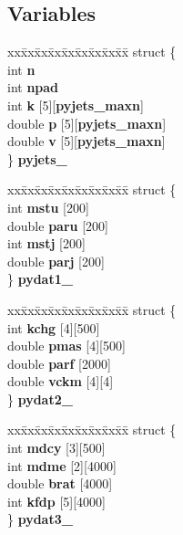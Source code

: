 \subsection*{Variables}
\begin{CompactItemize}
\item 
\begin{tabbing}
xx\=xx\=xx\=xx\=xx\=xx\=xx\=xx\=xx\=\kill
struct \{\\
\>int {\bf n}\\
\>int {\bf npad}\\
\>int {\bf k} [5][{\bf pyjets\_maxn}]\\
\>double {\bf p} [5][{\bf pyjets\_maxn}]\\
\>double {\bf v} [5][{\bf pyjets\_maxn}]\\
\} {\bf pyjets\_}\\

\end{tabbing}\item 
\begin{tabbing}
xx\=xx\=xx\=xx\=xx\=xx\=xx\=xx\=xx\=\kill
struct \{\\
\>int {\bf mstu} [200]\\
\>double {\bf paru} [200]\\
\>int {\bf mstj} [200]\\
\>double {\bf parj} [200]\\
\} {\bf pydat1\_}\\

\end{tabbing}\item 
\begin{tabbing}
xx\=xx\=xx\=xx\=xx\=xx\=xx\=xx\=xx\=\kill
struct \{\\
\>int {\bf kchg} [4][500]\\
\>double {\bf pmas} [4][500]\\
\>double {\bf parf} [2000]\\
\>double {\bf vckm} [4][4]\\
\} {\bf pydat2\_}\\

\end{tabbing}\item 
\begin{tabbing}
xx\=xx\=xx\=xx\=xx\=xx\=xx\=xx\=xx\=\kill
struct \{\\
\>int {\bf mdcy} [3][500]\\
\>int {\bf mdme} [2][4000]\\
\>double {\bf brat} [4000]\\
\>int {\bf kfdp} [5][4000]\\
\} {\bf pydat3\_}\\


\end{tabbing}
\end{CompactItemize}
